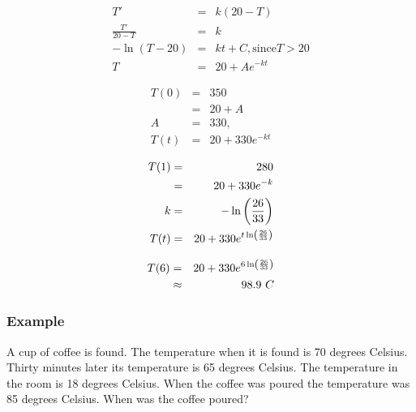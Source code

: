 \begin{frame}

  \begin{eqnarray*}
    T' & = & k (20-T) \\
    \frac{T'}{20-T} & = & k \\
    -\ln(T-20) & = & kt + C,  \text{since} T > 20\\
    T & = & 20 + A e^{-kt}
  \end{eqnarray*}

  \begin{eqnarray*}
    T(0) & = & 350 \\
    & = & 20 + A \\
    A & = & 330, \\
    T(t) & = & 20 + 330 e^{-kt}
  \end{eqnarray*}

\end{frame}


\begin{frame}

  \begin{eqnarray*}
    T(1) & = & 280 \\
    & = & 20 + 330 e^{-k} \\
    k & = & -\ln\left(\frac{26}{33}\right) \\
    T(t) & = & 20 + 330 e^{t\ln\left(\frac{26}{33}\right)}
  \end{eqnarray*}

  \begin{eqnarray*}
    T(6) & = & 20 + 330 e^{6\ln\left(\frac{26}{33}\right)} \\
    & \approx & 98.9 ~C
  \end{eqnarray*}

\end{frame}


\begin{frame}
  \frametitle{Example \\
    }

  A cup of coffee is found. {\color{red}The temperature when it is found is 70
  degrees Celsius.} {\color{blue}Thirty minutes later its temperature is 65 degrees
  Celsius.} {\color{purple}The temperature in the room is 18 degrees Celsius.} 
  {\color{orange}When the coffee was poured the temperature was 85 degrees Celsius.} 
  When was the coffee poured?


\end{frame}



